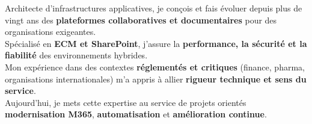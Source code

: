 \par{
Architecte d’infrastructures applicatives, je conçois et fais évoluer depuis plus de vingt ans des \textbf{plateformes collaboratives et documentaires} pour des organisations exigeantes.\\
Spécialisé en \textbf{ECM et SharePoint}, j’assure la \textbf{performance, la sécurité et la fiabilité} des environnements hybrides.\\
Mon expérience dans des contextes \textbf{réglementés et critiques} (finance, pharma, organisations internationales) m’a appris à allier \textbf{rigueur technique et sens du service}.\\
Aujourd’hui, je mets cette expertise au service de projets orientés \textbf{modernisation M365}, \textbf{automatisation} et \textbf{amélioration continue}.
}
